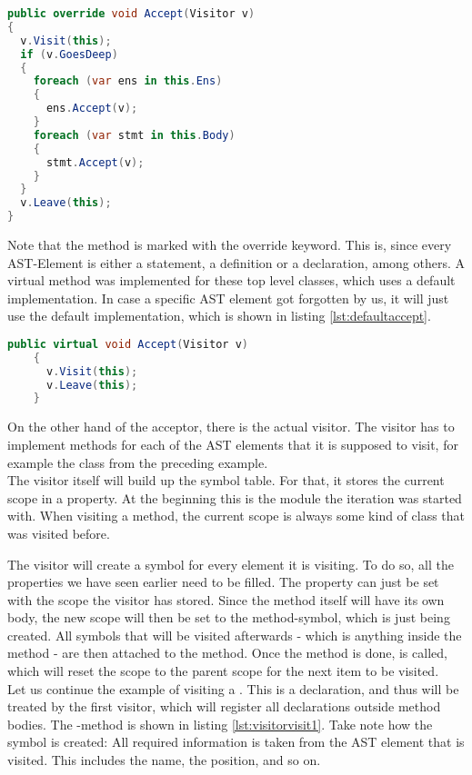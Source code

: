 \begin{lstlisting}[language=csharp, caption={Accepting a Visitor}, captionpos=b, label={lst:visitoraccept}]
public override void Accept(Visitor v)
{
  v.Visit(this);
  if (v.GoesDeep)
  {
    foreach (var ens in this.Ens)
    {
      ens.Accept(v);
    }
    foreach (var stmt in this.Body)
    {
      stmt.Accept(v);
    }
  }
  v.Leave(this);
}
\end{lstlisting}

Note that the method is marked with the override keyword.
This is, since every AST-Element is either a statement, a definition or a declaration, among others.
A virtual  method was implemented for these top level classes, which uses a default implementation.
In case a specific AST element got forgotten by us, it will just use the default implementation, which is shown in listing \ref{lst:defaultaccept}.

\begin{lstlisting}[language=csharp, caption={Default Accept}, captionpos=b, label={lst:defaultaccept}]
    public virtual void Accept(Visitor v)
    {
      v.Visit(this);
      v.Leave(this);
    }
\end{lstlisting}

On the other hand of the acceptor, there is the actual visitor.
The visitor has to implement  methods for each of the AST elements
that it is supposed to visit, for example the class  from the preceding example.\\

The visitor itself will build up the symbol table.
For that, it stores the current scope in a property.
At the beginning this is the module the iteration was started with.
When visiting a method, the current scope is always some kind of class that was visited before.

The visitor will create a symbol for every element it is visiting.
To do so, all the properties we have seen earlier need to be filled.
The property  can just be set with the scope the visitor has stored.
Since the method itself will have its own body, the new scope will then be set to the method-symbol, which is just being created.
All symbols that will be visited afterwards - which is anything inside the method - are then attached to the method.
Once the method is done,  is called, which will reset the scope to the parent scope for the next item to be visited.\\

Let us continue the example of visiting a .
This is a declaration, and thus will be treated by the first visitor, which will register all declarations outside method bodies.
The -method is shown in listing \ref{lst:visitorvisit1}.
Take note how the symbol is created: All required information is taken from the AST element  that is visited.
This includes the name, the position, and so on.\\

